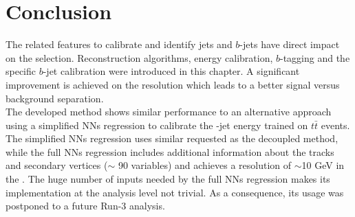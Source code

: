 \section{Conclusion}
\label{Jet:Conc}
The related features to calibrate and identify jets and $b$-jets have direct impact on the \HHyybb selection. Reconstruction algorithms, energy calibration, $b$-tagging and the specific $b$-jet calibration were introduced in this chapter. A significant improvement is achieved on the \mbb resolution which leads to a better signal versus background separation.\\
The developed method shows similar performance to an alternative approach using a simplified NNs regression to calibrate the \bq-jet energy trained on $t\bar{t}$ events. The simplified NNs regression uses similar requested as the decoupled method, while the full NNs regression includes additional information about the tracks and secondary vertices ($\sim$ 90 variables) and achieves a resolution of $\sim$10 GeV in the \mbb. The huge number of inputs needed by the full NNs regression makes its implementation at the analysis level not trivial. As a consequence, its usage was postponed to a future Run-3 analysis.
